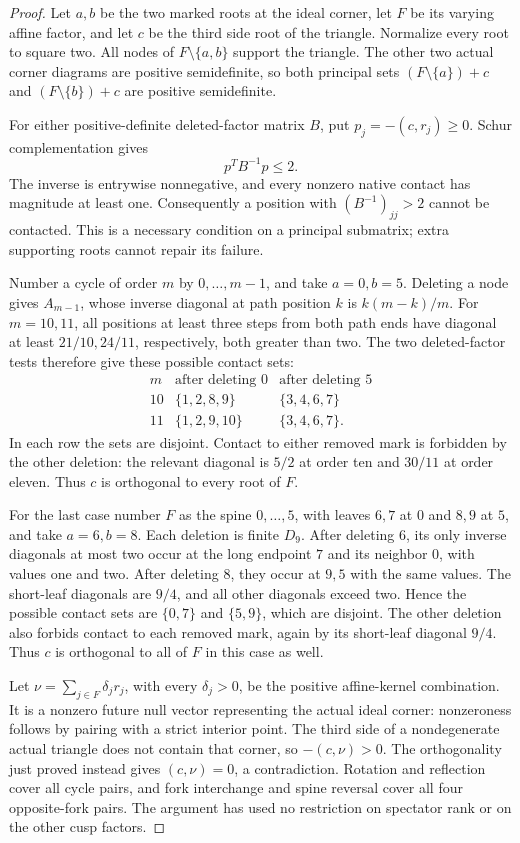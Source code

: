 \documentclass[11pt]{article}
\theoremstyle{remark}\newtheorem{remark}[theorem]{Remark}
\begin{document}
\begin{proof}
Let $a,b$ be the two marked roots at the ideal corner, let $F$ be its
varying affine factor, and let $c$ be the third side root of the
triangle. Normalize every root to square two. All nodes of
$F\setminus\{a,b\}$ support the triangle. The other two actual
corner diagrams are positive semidefinite, so both principal sets
$(F\setminus\{a\})+c$ and $(F\setminus\{b\})+c$ are positive
semidefinite.

For either positive-definite deleted-factor matrix $B$, put
$p_j=-(c,r_j)\ge0$. Schur complementation gives
\[
 p^TB^{-1}p\le2.
\]
The inverse is entrywise nonnegative, and every nonzero native contact
has magnitude at least one. Consequently a position with
$(B^{-1})_{jj}>2$ cannot be contacted. This is a necessary condition
on a principal submatrix; extra supporting roots cannot repair its
failure.

Number a cycle of order $m$ by $0,\ldots,m-1$, and take $a=0,b=5$.
Deleting a node gives $A_{m-1}$, whose inverse diagonal at path
position $k$ is $k(m-k)/m$. For $m=10,11$, all positions at least
three steps from both path ends have diagonal at least
$21/10,24/11$, respectively, both greater than two. The two
deleted-factor tests therefore give these possible contact sets:
\[
\begin{array}{c|c|c}
 m&\text{after deleting }0&\text{after deleting }5\\\hline
 10&\{1,2,8,9\}&\{3,4,6,7\}\\
 11&\{1,2,9,10\}&\{3,4,6,7\}.
\end{array}
\]
In each row the sets are disjoint. Contact to either removed mark
is forbidden by the other deletion: the relevant diagonal is
$5/2$ at order ten and $30/11$ at order eleven. Thus $c$ is
orthogonal to every root of $F$.

For the last case number $F$ as the spine $0,\ldots,5$, with
leaves $6,7$ at $0$ and $8,9$ at $5$, and take $a=6,b=8$.
Each deletion is finite $D_9$. After deleting $6$, its only
inverse diagonals at most two occur at the long endpoint $7$
and its neighbor $0$, with values one and two. After deleting
$8$, they occur at $9,5$ with the same values. The short-leaf
diagonals are $9/4$, and all other diagonals exceed two.
Hence the possible contact sets are $\{0,7\}$ and $\{5,9\}$,
which are disjoint. The other deletion also forbids contact to
each removed mark, again by its short-leaf diagonal $9/4$.
Thus $c$ is orthogonal to all of $F$ in this case as well.

Let $\nu=\sum_{j\in F}\delta_jr_j$, with every $\delta_j>0$,
be the positive affine-kernel combination. It is a nonzero future
null vector representing the actual ideal corner: nonzeroness
follows by pairing with a strict interior point. The third side
of a nondegenerate actual triangle does not contain that corner,
so $-(c,\nu)>0$. The orthogonality just proved instead gives
$(c,\nu)=0$, a contradiction. Rotation and reflection cover all
cycle pairs, and fork interchange and spine reversal cover all
four opposite-fork pairs. The argument has used no restriction
on spectator rank or on the other cusp factors.
\end{proof}
\end{document}
